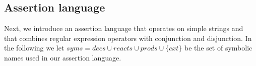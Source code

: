 \subsection{Assertion language}

%
%
%

Next, we introduce an assertion language that operates on simple strings
and that combines regular expression operators with conjunction and disjunction.
In the following we let $\mathit{syms} = \mathit{decs}\cup\mathit{reacts}\cup\mathit{prods}\cup\{\mathit{cxt}\}$ be the set of symbolic names used in our assertion language.

